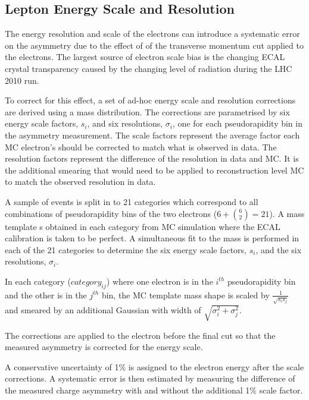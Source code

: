 \subsection{Lepton Energy Scale and Resolution}

The energy resolution and scale of the electrons can introduce a systematic
error on the asymmetry due to the effect of of the transverse momentum cut
applied to the electrons. The largest source of electron scale bias is the
changing ECAL crystal transparency caused by the changing level of radiation
during the \ac{LHC} 2010 run.

To correct for this effect, a set of ad-hoc energy scale and resolution corrections are
derived using a \Zee mass distribution. The corrections are parametrised by
six energy scale factors, $s_i$, and six resolutions, $\sigma_i$, one for each
pseudorapidity bin in the asymmetry measurement.
The scale factors represent the average factor each \ac{MC} electron's \Pt
should be corrected to match what is observed in data.
The resolution factors represent the difference of the resolution in data and
\ac{MC}. It is the additional smearing that would need to be applied to
reconstruction level \ac{MC} to match the observed resolution in data.

A sample of \Zee events is  split in to 21 categories which correspond to all
combinations of pseudorapidity bins of the two electrons ($6+\binom{6}{2} =
21$).  A mass template s obtained in each category from \ac{MC} simulation where
the \ac{ECAL} calibration is taken to be perfect.
A simultaneous fit to the \Zee mass is performed in each of the 21 categories
to determine the six energy scale factors, $s_i$, and the six resolutions, 
$\sigma_i$.

In each category ($category_{ij}$) where one electron is in the $i^{th}$
pseudorapidity bin and the other is in the $j^{th}$ bin, the \ac{MC} template
mass shape is scaled by $\frac{1}{\sqrt{s_i s_j} } $
and smeared by an additional Gaussian with width of
$\sqrt{\sigma_i^2+\sigma_j^2}$.

The corrections are applied to the electron before the final \Pt cut so that
the measured asymmetry is corrected for the energy scale.

A conservative uncertainty of \unit{1}{\% } is assigned to the electron energy
after the scale corrections. A systematic error is then estimated by measuring
the difference of the measured charge asymmetry with and without the additional
\unit{1}{\% } scale factor.


